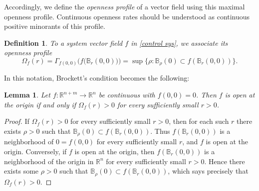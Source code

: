 \documentclass[pdflatex,sn-mathphys-num]{sn-jnl}%
\theoremstyle{thmstyleone}%
\newtheorem{lemma}[theorem]{Lemma}
\theoremstyle{thmstyletwo}%
\theoremstyle{thmstylethree}%
\newtheorem{definition}{Definition}%
\begin{document}

    Accordingly, we define the \textit{openness profile} of a vector field using this maximal openness profile.  Continuous openness rates should be understood as continuous positive minorants of this profile.
    

    \begin{definition}\label{openness profile definition}
        To a system vector field $f$ in \eqref{control sys}, we associate its \textit{openness profile} 
        \[
        \Omega_f(r)=\Gamma_{f(0,0)}\big(f\big(\mathbb{B}_r(0,0)\big)\big)=\sup\{\rho:\mathbb{B}_\rho(0)\subset f(\mathbb{B}_r(0,0))\}.
        \]
    \end{definition}

    
    In this notation, Brockett's condition becomes the following:

    
    \begin{lemma}
        Let $f:\mathbb{R}^{n+m}\to\mathbb{R}^n$ be continuous with $f(0,0)=0$. Then $f$ is open at the origin if and only if $\Omega_f(r)>0$ for every sufficiently small $r>0$.
    \end{lemma}
    
    
    \begin{proof}
        If $\Omega_f(r)>0$ for every sufficiently small $r>0$, then for each such $r$ there exists $\rho>0$ such that $\mathbb{B}_\rho(0)\subset f(\mathbb{B}_r(0,0))$.  Thus $f(\mathbb{B}_r(0,0))$ is a neighborhood of $0=f(0,0)$ for every sufficiently small $r$, and $f$ is open at the origin.  Conversely, if $f$ is open at the origin, then $f(\mathbb{B}_r(0,0))$ is a neighborhood of the origin in $\mathbb{R}^n$ for every sufficiently small $r>0$.  Hence there exists some $\rho>0$ such that $\mathbb{B}_\rho(0)\subset f(\mathbb{B}_r(0,0))$, which says precisely that $\Omega_f(r)>0$.
    \end{proof}
    
\end{document}
